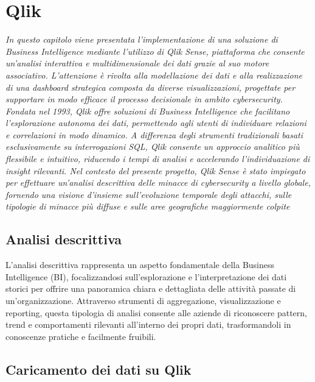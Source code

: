\chapter{Qlik} %

\begin{preamble}
{\em
In questo capitolo viene presentata l’implementazione di una soluzione di Business Intelligence mediante l’utilizzo di Qlik Sense, piattaforma che consente un’analisi interattiva e multidimensionale dei dati grazie al suo motore associativo.
L’attenzione è rivolta alla modellazione dei dati e alla realizzazione di una dashboard strategica composta da diverse visualizzazioni, progettate per supportare in modo efficace il processo decisionale in ambito cybersecurity.
Fondata nel 1993, Qlik offre soluzioni di Business Intelligence che facilitano l’esplorazione autonoma dei dati, permettendo agli utenti di individuare relazioni e correlazioni in modo dinamico. A differenza degli strumenti tradizionali basati esclusivamente su interrogazioni SQL, Qlik consente un approccio analitico più flessibile e intuitivo, riducendo i tempi di analisi e accelerando l’individuazione di insight rilevanti.
Nel contesto del presente progetto, Qlik Sense è stato impiegato per effettuare un’analisi descrittiva delle minacce di cybersecurity a livello globale, fornendo una visione d’insieme sull’evoluzione temporale degli attacchi, sulle tipologie di minacce più diffuse e sulle aree geografiche maggiormente colpite
}
\end{preamble}

\section{Analisi descrittiva}
L’analisi descrittiva rappresenta un aspetto fondamentale della Business Intelligence (BI), focalizzandosi sull’esplorazione e l’interpretazione dei dati storici per offrire una panoramica chiara e dettagliata delle attività passate di un’organizzazione. Attraverso strumenti di aggregazione, visualizzazione e reporting, questa tipologia di analisi consente alle aziende di riconoscere pattern, trend e comportamenti rilevanti all’interno dei propri dati, trasformandoli in conoscenze pratiche e facilmente fruibili.

\section{Caricamento dei dati su Qlik}

